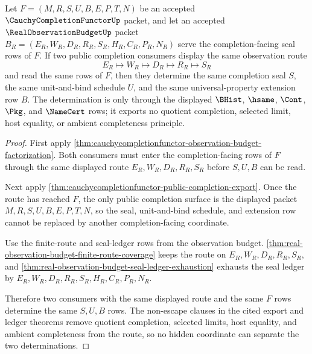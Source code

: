 \begin{theorem}
\label{thm:cauchycompletionfunctor-observation-budget-seal-determinacy}
Let $F=(M,R,S,U,B,E,P,T,N)$ be an accepted $\CauchyCompletionFunctorUp$ packet, and let an accepted $\RealObservationBudgetUp$ packet $B_R=(E_R,W_R,D_R,R_R,S_R,H_R,C_R,P_R,N_R)$ serve the completion-facing seal rows of $F$. If two public completion consumers display the same observation route
$$
E_R \longmapsto W_R \longmapsto D_R \longmapsto R_R \longmapsto S_R
$$
and read the same rows of $F$, then they determine the same completion seal $S$, the same unit-and-bind schedule $U$, and the same universal-property extension row $B$. The determination is only through the displayed $\BHist$, $\hsame$, $\Cont$, $\Pkg$, and $\NameCert$ rows; it exports no quotient completion, selected limit, host equality, or ambient completeness principle.
\end{theorem}
\begin{proof}
First apply \autoref{thm:cauchycompletionfunctor-observation-budget-factorization}. Both consumers must enter the completion-facing rows of $F$ through the same displayed route $E_R,W_R,D_R,R_R,S_R$ before $S,U,B$ can be read.

Next apply \autoref{thm:cauchycompletionfunctor-public-completion-export}. Once the route has reached $F$, the only public completion surface is the displayed packet $M,R,S,U,B,E,P,T,N$, so the seal, unit-and-bind schedule, and extension row cannot be replaced by another completion-facing coordinate.

Use the finite-route and seal-ledger rows from the observation budget. \autoref{thm:real-observation-budget-finite-route-coverage} keeps the route on $E_R,W_R,D_R,R_R,S_R$, and \autoref{thm:real-observation-budget-seal-ledger-exhaustion} exhausts the seal ledger by $E_R,W_R,D_R,R_R,S_R,H_R,C_R,P_R,N_R$.

Therefore two consumers with the same displayed route and the same $F$ rows determine the same $S,U,B$ rows. The non-escape clauses in the cited export and ledger theorems remove quotient completion, selected limits, host equality, and ambient completeness from the route, so no hidden coordinate can separate the two determinations.
\end{proof}

